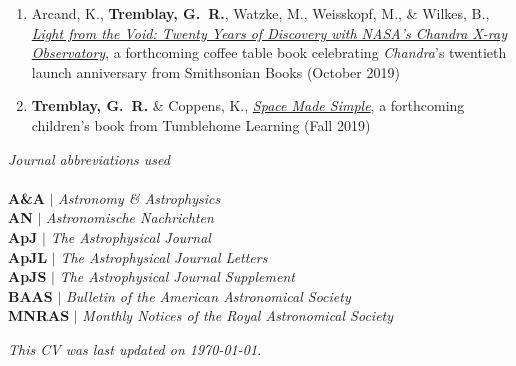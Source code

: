 \documentclass[11pt]{article}
\begin{document}
\begin{enumerate}


\item Arcand, K., \textbf{Tremblay, G.~R.}, Watzke, M., Weisskopf, M., \& Wilkes, B., \ul{\textit{Light from the Void: Twenty Years of Discovery with NASA's Chandra X-ray Observatory}}, a forthcoming coffee table book celebrating \textit{Chandra}'s
twentieth launch anniversary from Smithsonian Books (October 2019)

\item \textbf{Tremblay, G.~R.} \& Coppens, K., \uline{\textit{Space Made Simple}}, a forthcoming children's book from Tumblehome Learning (Fall 2019)

\end{enumerate}



\vspace*{10mm}

\noindent \textit{Journal abbreviations used}\\ \\
\textbf{A\&A} $|$ \textit{Astronomy \& Astrophysics}\\
\textbf{AN} $|$ \textit{Astronomische Nachrichten} \\
\textbf{ApJ} $|$ \textit{The Astrophysical Journal}\\
\textbf{ApJL} $|$ \textit{The Astrophysical Journal Letters}\\
\textbf{ApJS} $|$ \textit{The Astrophysical Journal Supplement}\\
\textbf{BAAS} $|$ \textit{Bulletin of the American Astronomical Society}\\
\textbf{MNRAS} $|$ \textit{Monthly Notices of the Royal Astronomical Society}\\






\vfill

\begin{center}
\noindent \textit{This CV was last updated on \today.}
\end{center}
\end{document}

